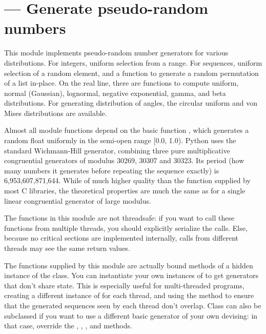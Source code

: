 \section{ ---
         Generate pseudo-random numbers}



This module implements pseudo-random number generators for various
distributions.
For integers, uniform selection from a range.
For sequences, uniform selection of a random element, and a function to
generate a random permutation of a list in-place.
On the real line, there are functions to compute uniform, normal (Gaussian),
lognormal, negative exponential, gamma, and beta distributions.
For generating distribution of angles, the circular uniform and
von Mises distributions are available.

Almost all module functions depend on the basic function
, which generates a random float uniformly in
the semi-open range [0.0, 1.0).  Python uses the standard Wichmann-Hill
generator, combining three pure multiplicative congruential
generators of modulus 30269, 30307 and 30323.  Its period (how many
numbers it generates before repeating the sequence exactly) is
6,953,607,871,644.  While of much higher quality than the 
function supplied by most C libraries, the theoretical properties
are much the same as for a single linear congruential generator of
large modulus.

The functions in this module are not threadsafe:  if you want to call these
functions from multiple threads, you should explicitly serialize the calls.
Else, because no critical sections are implemented internally, calls
from different threads may see the same return values.

The functions supplied by this module are actually bound methods of a
hidden instance of the  class.  You can instantiate your
own instances of  to get generators that don't share state.
This is especially useful for multi-threaded programs, creating a different
instance of  for each thread, and using the 
method to ensure that the generated sequences seen by each thread don't
overlap.  Class  can also be subclassed if you want to use a
different basic generator of your own devising:  in that case, override the
, , ,
 and  methods.


